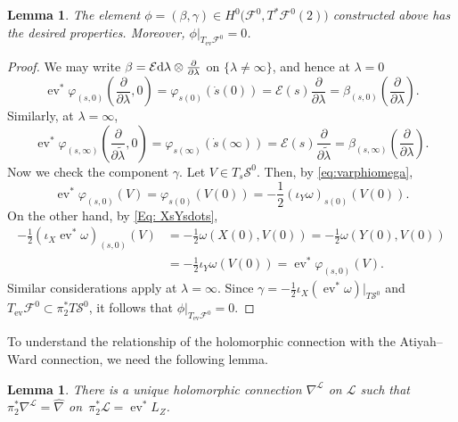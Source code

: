 \documentclass[pdftex]{sigma}
\numberwithin{equation}{section}
\newtheorem{Lemma}[Theorem]{Lemma}
\theoremstyle{definition}
\begin{document}
\begin{Lemma}\label{Lemma:holoconn}
The element $\phi = (\beta, \gamma) \in H^0\bigl(\mathcal F^0, T^*\mathcal F^0(2)\bigr)$
constructed above has the desired properties. Moreover, $\phi|_{T_{\operatorname{ev}}\mathcal F^0}
 = 0$.
\end{Lemma}

\begin{proof}
We may write $\beta = \mathcal E {\rm d}\lambda\otimes\frac{\partial}{\partial\lambda}$
on $\{\lambda\neq\infty\}$, and hence at $\lambda = 0$
\[
\operatorname{ev}^*\varphi_{(s,0)}\left(\frac{\partial}{\partial \lambda}, 0\right) =
\varphi_{s(0)} (\dot{s}(0)) = \mathcal{E}(s) \frac{\partial}{\partial \lambda}
 = \beta_{(s,0)}\left(\frac{\partial}{\partial\lambda}\right).
\]
Similarly, at $\lambda = \infty$,
\[
\operatorname{ev}^*\varphi_{(s,\infty)}\left(\frac{\partial}{\partial\widetilde \lambda}, 0\right) =
\varphi_{s(\infty)} (\dot{s}(\infty)) = \mathcal{E}(s) \frac{\partial}{\partial
\widetilde\lambda} = \beta_{(s,\infty)}\left(\frac{\partial}{\partial\lambda}\right).
\]
Now we check the component $\gamma$. Let $V \in T_s\mathcal S^0$. Then, by \eqref{eq:varphiomega},
\[
\operatorname{ev}^*\varphi_{(s,0)}(V) = \varphi_{s(0)}(V(0)) = -\frac{1}{2} (\iota_Y\omega)_{s(0)}(V(0)).
\]
On the other hand, by \eqref{Eq: XsYsdots},
\begin{align*}
-\frac{1}{2}(\iota_X\operatorname{ev}^*\omega)_{(s,0)}(V)& = -\frac{1}{2}\omega(X(0), V(0)) = -\frac{1}{2}\omega(Y(0), V(0)) \\
& = -\frac{1}{2}\iota_Y\omega(V(0)) = \operatorname{ev}^*\varphi_{(s,0)}(V).
\end{align*}
Similar considerations apply at $\lambda = \infty$. Since $\gamma
 = -\frac{1}{2}\iota_X(\operatorname{ev}^*\omega)|_{T\mathcal S^0}$ and $T_{\operatorname{ev}}\mathcal F^0
 \subset \pi_2^*T\mathcal S^0$, it follows that $\phi|_{T_{\operatorname{ev}}\mathcal F^0} = 0$.
\end{proof}

To understand the relationship of the holomorphic connection
 with the Atiyah--Ward connection, we need the following lemma.

\begin{Lemma}\label{Lemma:holconnpullback}
There is a unique holomorphic connection $\nabla^{\mathcal{L}}$ on $\mathcal{L}$ such that
$\pi_2^*\nabla^{\mathcal L} = \widehat{\nabla}$ on~${\pi_2^*\mathcal L = \operatorname{ev}^*L_Z}$.
\end{Lemma}
\end{document}
